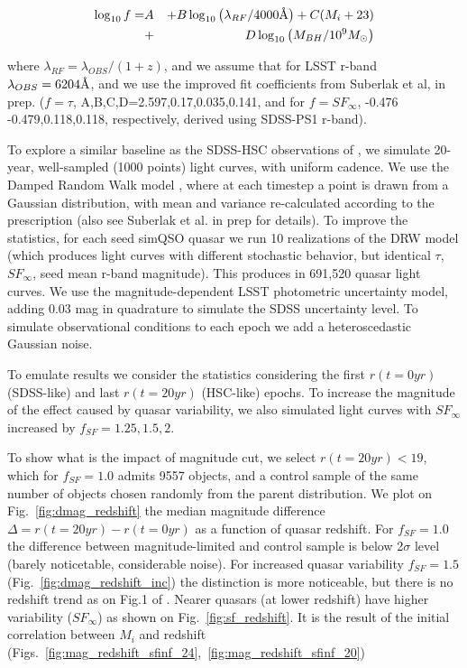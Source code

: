 \documentclass[twocolumn]{aastex62}
\let\oldAA\AA
\renewcommand{\AA}{\text{\normalfont\oldAA}}
\begin{document}
\begin{eqnarray}
\label{eq:powlawmodel}
\log_{10}{f} = &A& + B \log_{10}\left( \lambda_{RF} / 4000 \mbox{\AA} \right) + C (M_{i} + 23) \nonumber \\
&+& D \log_{10}{\left( M_{BH} / 10^{9} M_{\odot}  \right)} 
\end{eqnarray} 

where  $\lambda_{RF} = \lambda_{OBS} / (1+z)$, and we assume that for LSST r-band $\lambda_{OBS} =6204 \mbox{\AA} $, and we use the 
 improved fit coefficients from Suberlak et al, in prep. ($f=\tau$, A,B,C,D=2.597,0.17,0.035,0.141, and for $f=SF_{\infty}$, -0.476 -0.479,0.118,0.118, respectively, derived using SDSS-PS1 r-band).

To explore a similar baseline as the SDSS-HSC observations of \citet{caplar2020}, we simulate 20-year, well-sampled (1000 points) light curves, with uniform cadence. We use the Damped Random Walk model \citep{kelly2009}, where at each timestep a point is drawn from a Gaussian distribution, with mean and variance re-calculated according to the \citet{macleod2010} prescription (also see Suberlak et al. in prep for details).  To improve the statistics, for each seed simQSO quasar we run 10 realizations of the DRW model (which produces light curves with different stochastic behavior, but identical  $\tau$, $SF_{\infty}$, seed mean r-band magnitude). This produces in 691,520 quasar light curves. We use the magnitude-dependent LSST photometric uncertainty model, adding 0.03 mag in quadrature to simulate the SDSS uncertainty level. To simulate observational conditions to each epoch we add a heteroscedastic Gaussian noise. 


To emulate \cite{caplar2020} results we consider the statistics considering the first $r(t=0 yr)$  (SDSS-like) and last  $r(t=20 yr)$ (HSC-like) epochs. To increase the magnitude of the effect caused by quasar variability, we also simulated light curves with $SF_{\infty}$ increased by $f_{SF}=1.25,1.5,2$.  

To show what is the impact of magnitude cut, we select $r(t=20 yr)<19$, which for $f_{SF}=1.0$ admits 9557 objects, and a control sample of the same number of objects chosen randomly from the parent distribution. We plot on Fig.~\ref{fig:dmag_redshift} the median magnitude difference $\Delta = r(t=20 yr)  - r(t=0 yr)$ as a function of quasar redshift. For $f_{SF}=1.0$ the difference between magnitude-limited and control sample is below 2$\sigma$ level (barely noticetable, considerable noise). For increased quasar variability $f_{SF}=1.5$ (Fig.~\ref{fig:dmag_redshift_inc}) the distinction is more noticeable, but there is no redshift trend as on Fig.1 of \citet{caplar2020}. Nearer quasars (at lower redshift) have higher variability ($SF_{\infty}$) as shown on Fig.~\ref{fig:sf_redshift}. It is the result of the initial correlation between $M_{i}$ and redshift (Figs.~\ref{fig:mag_redshift_sfinf_24},~\ref{fig:mag_redshift_sfinf_20})
\end{document}
